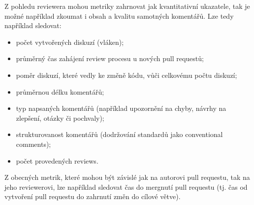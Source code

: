 \vspace{8pt}

Z pohledu reviewera mohou metriky zahrnovat jak kvantitativní ukazatele, tak je možné například zkoumat i obsah a kvalitu samotných komentářů. Lze tedy například sledovat:
\begin{itemize}[topsep=4pt, itemsep=2pt]
    \item počet vytvořených diskuzí (vláken);
    \item průměrný čas zahájení review procesu u nových pull requestů;
    \item poměr diskuzí, které vedly ke změně kódu, vůči celkovému počtu diskuzí;
    \item průměrnou délku komentářů;
    \item typ napsaných komentářů (například upozornění na chyby, návrhy na zlepšení, otázky či pochvaly);
    \item strukturovanost komentářů (dodržování standardů jako conventional comments);
    \item počet provedených reviews.
\end{itemize}

\vspace{8pt}

Z obecných metrik, které mohou být závislé jak na autorovi pull requestu, tak na jeho reviewerovi, lze například sledovat čas do mergnutí pull requestu (tj. čas od vytvoření pull requestu do zahrnutí změn do cílové větve).
